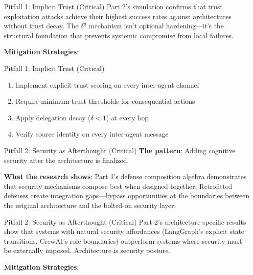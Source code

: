 \documentclass[
  ignorenonframetext,
]{beamer}
\providecommand{\tightlist}{%
  \setlength{\itemsep}{0pt}\setlength{\parskip}{0pt}}
\begin{document}
\begin{frame}[allowframebreaks]{Pitfall 1: Implicit Trust (Critical)}
Part 2's simulation confirms that trust exploitation attacks achieve
their highest success rates against architectures without trust decay.
The \(\delta^d\) mechanism isn't optional hardening---it's the
structural foundation that prevents systemic compromise from local
failures.

\textbf{Mitigation Strategies}:

\end{frame}

\begin{frame}[allowframebreaks]{Pitfall 1: Implicit Trust (Critical)}
\begin{enumerate}
\tightlist
\item
  Implement explicit trust scoring on every inter-agent channel
\item
  Require minimum trust thresholds for consequential actions
\item
  Apply delegation decay (\(\delta < 1\)) at every hop
\item
  Verify source identity on every inter-agent message
\end{enumerate}
\end{frame}

\begin{frame}[allowframebreaks]{Pitfall 2: Security as Afterthought
(Critical)}
\protect{}\label{pitfall-2-security-as-afterthought-critical}
\textbf{The pattern}: Adding cognitive security after the architecture
is finalized.

\textbf{What the research shows}: Part 1's defense composition algebra
demonstrates that security mechanisms compose best when designed
together. Retrofitted defenses create integration gaps---bypass
opportunities at the boundaries between the original architecture and
the bolted-on security layer.

\end{frame}

\begin{frame}[allowframebreaks]{Pitfall 2: Security as Afterthought
(Critical)}
Part 2's architecture-specific results show that systems with natural
security affordances (LangGraph's explicit state transitions, CrewAI's
role boundaries) outperform systems where security must be externally
imposed. Architecture is security posture.

\textbf{Mitigation Strategies}:

\end{frame}
\end{document}
